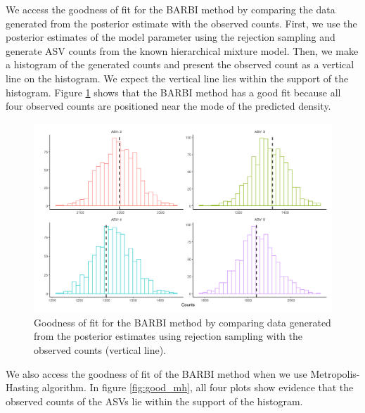 \documentclass[12pt]{article}
\begin{document}
We access the goodness of fit for the BARBI method by comparing the data generated from the posterior estimate with the observed counts. First, we use the posterior estimates of the model parameter using the rejection sampling and generate ASV counts from the known hierarchical mixture model. Then, we make a histogram of the generated counts and present the observed count as a vertical line on the histogram. We expect the vertical line lies within the support of the histogram. Figure \ref{fig:good_rs} shows that the BARBI method has a good fit because all four observed counts are positioned near the mode of the predicted density.

\begin{figure}[H]
	\centering
	\includegraphics[width=\textwidth]{goodness_rs.png}
	\caption{Goodness of fit for the BARBI method by comparing data generated from the posterior estimates using rejection sampling with the observed counts (vertical line).}
	\label{fig:good_rs}     
\end{figure}


We also access the goodness of fit of the BARBI method when we use Metropolis- Hasting algorithm. In figure \ref{fig:good_mh}, all four plots show evidence that the observed counts of the ASVs lie within the support of the histogram. 
\end{document}
